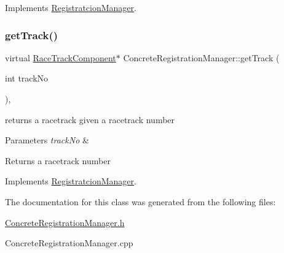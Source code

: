 Implements \mbox{\hyperlink{class_registratcion_manager_a2e06d0bf5f81b2a30d19f242bb2f583d}{Registratcion\+Manager}}.

\mbox{\label{class_concrete_registration_manager_a0a6cb4186150d569ac883c66860a52ef}} 
\subsubsection{\texorpdfstring{get\+Track()}{getTrack()}}
{\footnotesize\ttfamily virtual \mbox{\hyperlink{class_race_track_component}{Race\+Track\+Component}}$\ast$ Concrete\+Registration\+Manager\+::get\+Track (\begin{DoxyParamCaption}\item[{int}]{track\+No }\end{DoxyParamCaption})\hspace{0.3cm}{\ttfamily [inline]}, {\ttfamily [virtual]}}

returns a racetrack given a racetrack number 
\begin{DoxyParams}{Parameters}
{\em track\+No} & \\
\hline
\end{DoxyParams}
\begin{DoxyReturn}{Returns}
a racetrack number 
\end{DoxyReturn}


Implements \mbox{\hyperlink{class_registratcion_manager_afc647bf31a1e48c6d6a4b5f1156f9649}{Registratcion\+Manager}}.



The documentation for this class was generated from the following files\+:\begin{DoxyCompactItemize}
\item 
\mbox{\hyperlink{_concrete_registration_manager_8h}{Concrete\+Registration\+Manager.\+h}}\item 
Concrete\+Registration\+Manager.\+cpp\end{DoxyCompactItemize}
